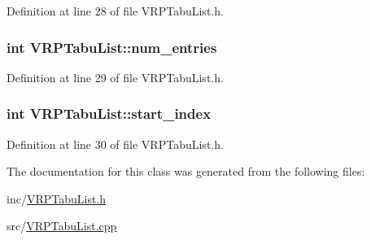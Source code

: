 Definition at line 28 of file VRPTabuList.h.

\hypertarget{class_v_r_p_tabu_list_aeb64bb8470793cd64c5ea9036fb1763b}{
\subsubsection[{num\_\-entries}]{\setlength{\rightskip}{0pt plus 5cm}int {\bf VRPTabuList::num\_\-entries}}}
\label{class_v_r_p_tabu_list_aeb64bb8470793cd64c5ea9036fb1763b}


Definition at line 29 of file VRPTabuList.h.

\hypertarget{class_v_r_p_tabu_list_ad6970eb53ab71e79bb6ec7230d505d5d}{
\subsubsection[{start\_\-index}]{\setlength{\rightskip}{0pt plus 5cm}int {\bf VRPTabuList::start\_\-index}}}
\label{class_v_r_p_tabu_list_ad6970eb53ab71e79bb6ec7230d505d5d}


Definition at line 30 of file VRPTabuList.h.



The documentation for this class was generated from the following files:\begin{DoxyCompactItemize}
\item 
inc/\hyperlink{_v_r_p_tabu_list_8h}{VRPTabuList.h}\item 
src/\hyperlink{_v_r_p_tabu_list_8cpp}{VRPTabuList.cpp}\end{DoxyCompactItemize}
